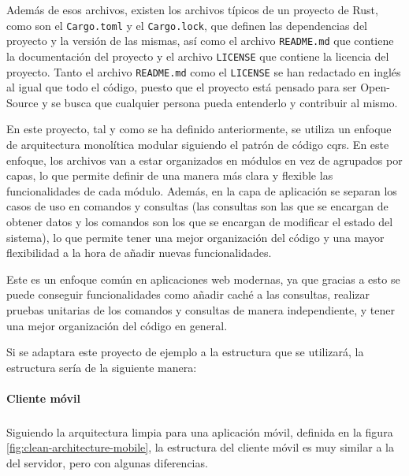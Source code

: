 Además de esos archivos, existen los archivos típicos de un proyecto de Rust, como son el \texttt{Cargo.toml} y el \texttt{Cargo.lock}, que definen las dependencias del proyecto y la versión de las mismas, así como el archivo \texttt{README.md} que contiene la documentación del proyecto y el archivo \texttt{LICENSE} que contiene la licencia del proyecto. Tanto el archivo \texttt{README.md} como el \texttt{LICENSE} se han redactado en inglés al igual que todo el código, puesto que el proyecto está pensado para ser Open-Source y se busca que cualquier persona pueda entenderlo y contribuir al mismo.

En este proyecto, tal y como se ha definido anteriormente, se utiliza un enfoque de arquitectura monolítica modular siguiendo el patrón de código \acrshort{cqrs}.
En este enfoque, los archivos van a estar organizados en módulos en vez de agrupados por capas, lo que permite definir de una manera más clara y flexible las funcionalidades de cada módulo.
Además, en la capa de aplicación se separan los casos de uso en comandos y consultas (las consultas son las que se encargan de obtener datos y los comandos son los que se encargan de modificar el estado del sistema), lo que permite tener una mejor organización del código y una mayor flexibilidad a la hora de añadir nuevas funcionalidades.

Este es un enfoque común en aplicaciones web modernas, ya que gracias a esto se puede conseguir funcionalidades como añadir caché a las consultas, realizar pruebas unitarias de los comandos y consultas de manera independiente, y tener una mejor organización del código en general.

Si se adaptara este proyecto de ejemplo a la estructura que se utilizará, la estructura sería de la siguiente manera:

\newpage
{}

\paragraph{Cliente móvil}
\subparagraph{}
Siguiendo la arquitectura limpia para una aplicación móvil, definida en la figura \ref{fig:clean-architecture-mobile}, la estructura del cliente móvil es muy similar a la del servidor, pero con algunas diferencias.

